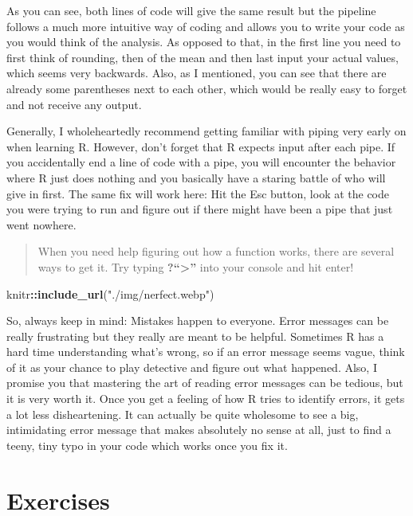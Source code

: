 \documentclass[
]{book}
\newenvironment{Shaded}{\begin{snugshade}}{\end{snugshade}}
\newcommand{\FunctionTok}[1]{\textcolor[rgb]{0.13,0.29,0.53}{\textbf{#1}}}
\newcommand{\NormalTok}[1]{#1}
\newcommand{\SpecialCharTok}[1]{\textcolor[rgb]{0.81,0.36,0.00}{\textbf{#1}}}
\newcommand{\StringTok}[1]{\textcolor[rgb]{0.31,0.60,0.02}{#1}}
\begin{document}
As you can see, both lines of code will give the same result but the pipeline follows a much more intuitive way of coding and allows you to write your code as you would think of the analysis.
As opposed to that, in the first line you need to first think of rounding, then of the mean and then last input your actual values, which seems very backwards.
Also, as I mentioned, you can see that there are already some parentheses next to each other, which would be really easy to forget and not receive any output.

Generally, I wholeheartedly recommend getting familiar with piping very early on when learning R.
However, don't forget that R expects input after each pipe.
If you accidentally end a line of code with a pipe, you will encounter the behavior where R just does nothing and you basically have a staring battle of who will give in first.
The same fix will work here: Hit the Esc button, look at the code you were trying to run and figure out if there might have been a pipe that just went nowhere.

\begin{quote}
When you need help figuring out how a function works, there are several ways to get it. Try typing \textbf{?``\textbar\textgreater{}'' } into your console and hit enter!
\end{quote}

\begin{Shaded}
\begin{Highlighting}[]
\NormalTok{knitr}\SpecialCharTok{::}\FunctionTok{include\_url}\NormalTok{(}\StringTok{"./img/nerfect.webp"}\NormalTok{)}
\end{Highlighting}
\end{Shaded}

So, always keep in mind: Mistakes happen to everyone.
Error messages can be really frustrating but they really are meant to be helpful.
Sometimes R has a hard time understanding what's wrong, so if an error message seems vague, think of it as your chance to play detective and figure out what happened.
Also, I promise you that mastering the art of reading error messages can be tedious, but it is very worth it.
Once you get a feeling of how R tries to identify errors, it gets a lot less disheartening.
It can actually be quite wholesome to see a big, intimidating error message that makes absolutely no sense at all, just to find a teeny, tiny typo in your code which works once you fix it.

\section*{Exercises}\label{exercises}
\end{document}

